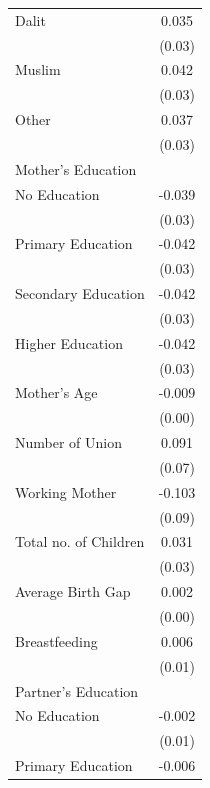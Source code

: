 \begin{longtable}{l*{1}{c}}
\hspace{1em}Dalit & 0.035 \\
                    & (0.03) \\
\hspace{1em}Muslim & 0.042 \\
                    & (0.03) \\
\hspace{1em}Other & 0.037 \\
                    & (0.03) \\
\multicolumn{2}{l}{Mother's Education} \\
\hspace{1em}No Education & -0.039 \\
                    & (0.03) \\
\hspace{1em}Primary Education & -0.042 \\
                    & (0.03) \\
\hspace{1em}Secondary Education & -0.042 \\
                    & (0.03) \\
\hspace{1em}Higher Education & -0.042 \\
                    & (0.03) \\
Mother's Age & -0.009\sym{**} \\
                    & (0.00) \\
Number of Union & 0.091 \\
                    & (0.07) \\
Working Mother & -0.103 \\
                    & (0.09) \\
Total no. of Children & 0.031 \\
                    & (0.03) \\
Average Birth Gap & 0.002\sym{**} \\
                    & (0.00) \\
Breastfeeding & 0.006 \\
                    & (0.01) \\
\multicolumn{2}{l}{Partner's Education} \\
\hspace{1em}No Education & -0.002 \\
                    & (0.01) \\
\hspace{1em}Primary Education & -0.006 \\

\end{longtable}
